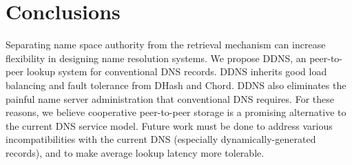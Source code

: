 \section{Conclusions}

Separating name space authority from the 
retrieval mechanism can increase flexibility 
in designing name resolution systems. 
We propose DDNS, an peer-to-peer lookup system for
conventional DNS records.
DDNS inherits good load balancing and fault tolerance
from DHash and Chord.
DDNS also eliminates the painful name server administration that
conventional DNS requires.
For these reasons, we believe cooperative peer-to-peer storage is a
promising alternative to the current DNS service model.
Future work must be done to address various
incompatibilities with the current DNS (especially 
dynamically-generated records), and to make average
lookup latency more tolerable.
